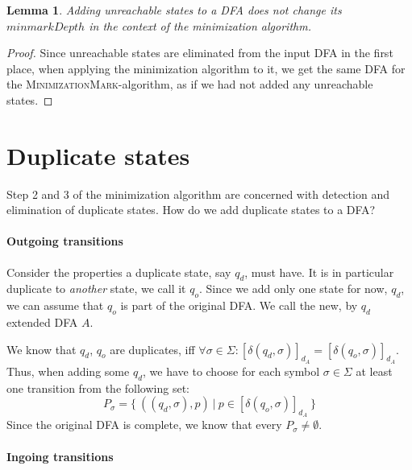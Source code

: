 \documentclass[a4paper, oneside, 11pt]{report}
\newtheorem{lemma}{Lemma}
\theoremstyle{definition}
\newtheorem{definition}{Definition}
\theoremstyle{remark}
\newcommand{\MinMark}{\textsc{MinimizationMark}}
\begin{document}
\begin{lemma}
	Adding unreachable states to a DFA does not change its $minmarkDepth$ in the context of the minimization algorithm.
\end{lemma}
\begin{proof}
	Since unreachable states are eliminated from the input DFA in the first place, when applying the minimization algorithm to it, we get the same DFA for the \MinMark-algorithm, as if we had not added any unreachable states.
\end{proof}

\section{Duplicate states}


Step 2 and 3 of the minimization algorithm are concerned with detection and elimination of duplicate states. How do we add duplicate states to a DFA?

\paragraph*{Outgoing transitions}

Consider the properties a duplicate state, say $q_d$, must have. It is in particular duplicate to \emph{another} state, we call it $q_o$. Since we add only one state for now, $q_d$, we can assume that $q_o$ is part of the original DFA. We call the new, by $q_d$ extended DFA $A$.

We know that $q_d$, $q_o$ are duplicates, iff $\forall \sigma \in \Sigma \colon [\delta(q_d, \sigma)]_{d_A} = [\delta(q_o, \sigma)]_{d_A}$. Thus, when adding some $q_d$, we have to choose for each symbol $\sigma \in \Sigma$ at least one transition from the following set:
\[
	P_\sigma = \{\ ((q_d, \sigma), p)\ |\ p \in [\delta(q_o, \sigma)]_{d_A}\ \}
\]
Since the original DFA is complete, we know that every $P_\sigma \neq \emptyset$.

\paragraph*{Ingoing transitions}
\end{document}
